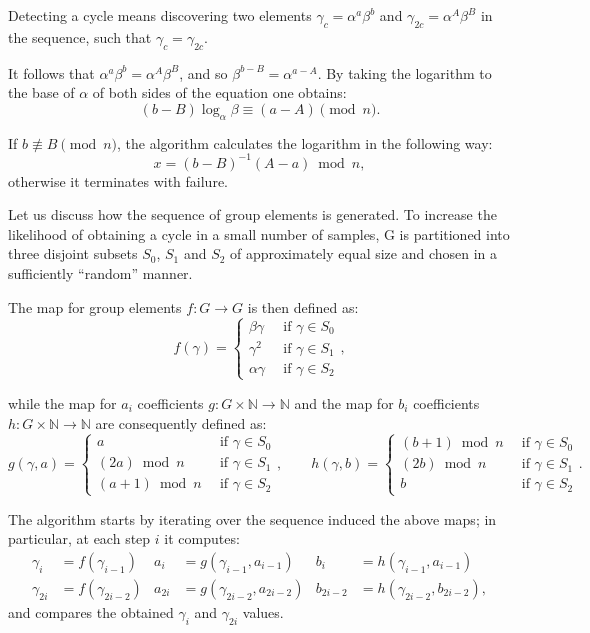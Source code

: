 \documentclass[UTF8]{article}
\begin{document}
Detecting a cycle means discovering two elements $\gamma_c = \alpha^{a}\beta^{b}$ and $\gamma_{2c} = \alpha^{A} \beta^{B}$ in the sequence, such that $\gamma_c = \gamma_{2c}$.

It follows that $\alpha^{a} \beta^{b} = \alpha^{A} \beta^{B}$, and so $\beta^{b - B} = \alpha^{a - A}$. By taking the logarithm to the base of $\alpha$ of both sides of the equation one obtains:
$$(b - B) \log_\alpha{\beta} \equiv (a - A) \pmod{n}.$$

If $b \not\equiv B \pmod{n}$, the algorithm calculates the logarithm in the following way:
$$x = (b - B)^{-1} (A - a) \bmod{n},$$
otherwise it terminates with failure.

Let us discuss how the sequence of group elements is generated. To increase the likelihood of obtaining a cycle in a small number of samples, G is partitioned into three disjoint subsets $S_0$, $S_1$ and $S_2$ of approximately equal size and chosen in a sufficiently ``random'' manner.

The map for group elements $f: G \rightarrow G$ is then defined as:
$$
f(\gamma) =
\begin{cases}
    \beta \gamma  & \enspace \text{if } \gamma \in S_0 \\
    \gamma^2      & \enspace \text{if } \gamma \in S_1 \\
    \alpha \gamma & \enspace \text{if } \gamma \in S_2
\end{cases},
$$

while the map for $a_i$ coefficients $g: G \times \mathbb{N} \rightarrow \mathbb{N}$ and the map for $b_i$ coefficients $h: G \times \mathbb{N} \rightarrow \mathbb{N}$ are consequently defined as:
$$
g(\gamma, a) =
\begin{cases}
    a                & \enspace \text{if } \gamma \in S_0 \\
    (2a)    \bmod{n} & \enspace \text{if } \gamma \in S_1 \\
    (a + 1) \bmod{n} & \enspace \text{if } \gamma \in S_2
\end{cases},
\qquad
h(\gamma, b) =
\begin{cases}
    (b + 1) \bmod{n} & \enspace \text{if } \gamma \in S_0 \\
    (2b)    \bmod{n} & \enspace \text{if } \gamma \in S_1 \\
    b                & \enspace \text{if } \gamma \in S_2
\end{cases}.
$$

The algorithm starts by iterating over the sequence induced the above maps; in particular, at each step $i$ it computes:
\begin{align*}
    \gamma_{i}  & = f(\gamma_{i-1})  & a_{i}  & = g(\gamma_{i-1}, a_{i-1})   & b_{i}    & = h(\gamma_{i-1}, a_{i-1})   \\
    \gamma_{2i} & = f(\gamma_{2i-2}) & a_{2i} & = g(\gamma_{2i-2}, a_{2i-2}) & b_{2i-2} & = h(\gamma_{2i-2}, b_{2i-2}),
\end{align*}
and compares the obtained $\gamma_{i}$ and $\gamma_{2i}$ values.
\end{document}
